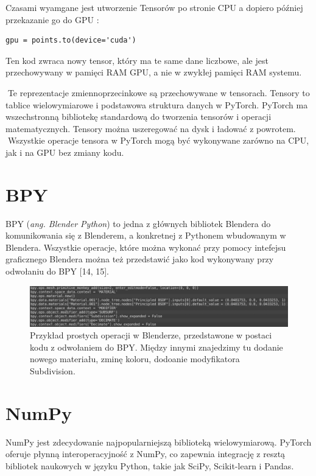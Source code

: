 \documentclass[brudnopis]{xmgr}
\begin{document}
Czasami wyamgane jest utworzenie Tensorów po stronie CPU a dopiero później przekazanie go do GPU :

\begin{lstlisting}
gpu = points.to(device='cuda')
\end{lstlisting}


Ten kod zwraca nowy tensor, który ma te same dane liczbowe, ale jest przechowywany w pamięci RAM GPU, a nie w zwykłej pamięci RAM systemu.

􏰹Te reprezentacje zmiennoprzecinkowe są przechowywane w tensorach. Tensory to tablice wielowymiarowe i podstawowa struktura danych w PyTorch. PyTorch ma wszechstronną bibliotekę standardową do tworzenia tensorów i operacji matematycznych. Tensory można uszeregować na dysk i ładować z powrotem.
􏰹Wszystkie operacje tensora w PyTorch mogą być wykonywane zarówno na CPU, jak i na GPU bez zmiany kodu.

  \section{BPY\label{s:dsssl}}
  
  BPY (\textit{ang. Blender Python}) to jedna z głównych bibliotek Blendera do komunikowania się z Blenderem, a konkretnej z Pythonem wbudowanym w Blendera. Wszystkie operacje, które można wykonać przy pomocy intefejsu graficznego Blendera można też przedstawić jako kod wykonywany przy odwołaniu do BPY [14, 15].
  
  
  \begin{figure}[!tbh]
\centering
\includegraphics[width=1.1\hsize]{fig/8}
\caption{Przykład prostych operacji w Blenderze, przedstawone w postaci kodu z odwołaniem do BPY. Między innymi znajedzimy tu dodanie nowego materiału, zminę koloru, dodoanie modyfikatora Subdivision.\label{RYS.3}}
\end{figure}
  
    \section{NumPy\label{s:dsssl}}
    
    NumPy jest zdecydowanie najpopularniejszą biblioteką wielowymiarową. PyTorch oferuje płynną interoperacyjność z NumPy, co zapewnia integrację z resztą bibliotek naukowych w języku Python, takie jak SciPy, Scikit-learn i Pandas.
    
\end{document}
